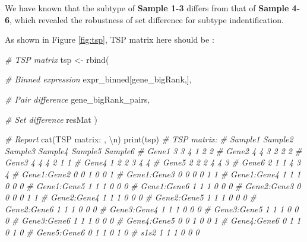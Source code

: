 \documentclass[
  12pt,
]{book}
\newenvironment{Shaded}{\begin{snugshade}}{\end{snugshade}}
\newcommand{\CommentTok}[1]{\textcolor[rgb]{0.56,0.35,0.01}{\textit{#1}}}
\newcommand{\FunctionTok}[1]{\textcolor[rgb]{0.00,0.00,0.00}{#1}}
\newcommand{\NormalTok}[1]{#1}
\newcommand{\OtherTok}[1]{\textcolor[rgb]{0.56,0.35,0.01}{#1}}
\newcommand{\SpecialCharTok}[1]{\textcolor[rgb]{0.00,0.00,0.00}{#1}}
\newcommand{\StringTok}[1]{\textcolor[rgb]{0.31,0.60,0.02}{#1}}
\begin{document}
We have known that the subtype of \textbf{Sample 1-3} differs from that of \textbf{Sample 4-6}, which revealed the robustness of set difference for subtype indentification.

As shown in Figure \ref{fig:tsp}, TSP matrix here should be :

\begin{Shaded}
\begin{Highlighting}[]

\CommentTok{\# TSP matrix}
\NormalTok{tsp }\OtherTok{\textless{}{-}} \FunctionTok{rbind}\NormalTok{(}
  
  \CommentTok{\# Binned expression}
\NormalTok{  expr\_binned[gene\_bigRank,],}
  
  \CommentTok{\# Pair difference}
\NormalTok{  gene\_bigRank\_pairs,}
  
  \CommentTok{\# Set difference}
\NormalTok{  resMat}
\NormalTok{)}

\CommentTok{\# Report }
\FunctionTok{cat}\NormalTok{(}\StringTok{\textquotesingle{}TSP matrix: \textquotesingle{}}\NormalTok{, }\StringTok{\textquotesingle{}}\SpecialCharTok{\textbackslash{}n}\StringTok{\textquotesingle{}}\NormalTok{)}
\FunctionTok{print}\NormalTok{(tsp)}
\CommentTok{\# TSP matrix:  }
\CommentTok{\#             Sample1 Sample2 Sample3 Sample4 Sample5 Sample6}
\CommentTok{\# Gene1             3       3       4       1       2       2}
\CommentTok{\# Gene2             4       4       3       2       2       2}
\CommentTok{\# Gene3             4       4       4       2       1       1}
\CommentTok{\# Gene4             1       2       2       3       4       4}
\CommentTok{\# Gene5             2       2       2       4       4       3}
\CommentTok{\# Gene6             2       1       1       4       3       4}
\CommentTok{\# Gene1:Gene2       0       0       1       0       0       1}
\CommentTok{\# Gene1:Gene3       0       0       0       0       1       1}
\CommentTok{\# Gene1:Gene4       1       1       1       0       0       0}
\CommentTok{\# Gene1:Gene5       1       1       1       0       0       0}
\CommentTok{\# Gene1:Gene6       1       1       1       0       0       0}
\CommentTok{\# Gene2:Gene3       0       0       0       0       1       1}
\CommentTok{\# Gene2:Gene4       1       1       1       0       0       0}
\CommentTok{\# Gene2:Gene5       1       1       1       0       0       0}
\CommentTok{\# Gene2:Gene6       1       1       1       0       0       0}
\CommentTok{\# Gene3:Gene4       1       1       1       0       0       0}
\CommentTok{\# Gene3:Gene5       1       1       1       0       0       0}
\CommentTok{\# Gene3:Gene6       1       1       1       0       0       0}
\CommentTok{\# Gene4:Gene5       0       0       1       0       0       1}
\CommentTok{\# Gene4:Gene6       0       1       1       0       1       0}
\CommentTok{\# Gene5:Gene6       0       1       1       0       1       0}
\CommentTok{\# s1s2              1       1       1       0       0       0}
\end{Highlighting}
\end{Shaded}
\end{document}
